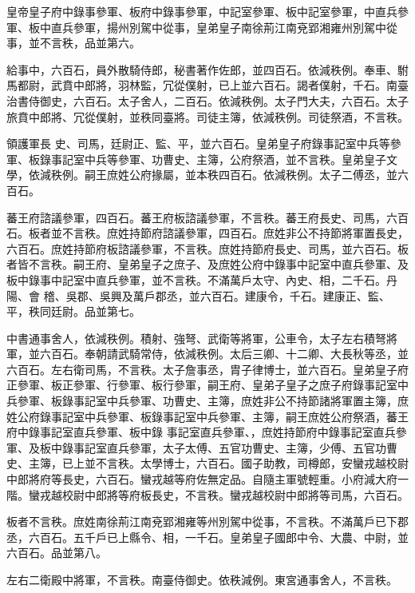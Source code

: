 \begin{pinyinscope}
 皇帝皇子府中錄事參軍、板府中錄事參軍，中記室參軍、板中記室參軍，中直兵參軍、板中直兵參軍，揚州別駕中從事，皇弟皇子南徐荊江南兗郢湘雍州別駕中從事，並不言秩，品並第六。



 給事中，六百石，員外散騎侍郎，秘書著作佐郎，並四百石。依減秩例。奉車、駙馬都尉，武賁中郎將，羽林監，冗從僕射，已上並六百石。謁者僕射，千石。南臺治書侍御史，六百石。太子舍人，二百石。依減秩例。太子門大夫，六百石。太子旅賁中郎將、冗從僕射，並秩同臺將。司徒主簿，依減秩例。司徒祭酒，不言秩。



 領護軍長
 史、司馬，廷尉正、監、平，並六百石。皇弟皇子府錄事記室中兵等參軍、板錄事記室中兵等參軍、功曹史、主簿，公府祭酒，並不言秩。皇弟皇子文學，依減秩例。嗣王庶姓公府掾屬，並本秩四百石。依減秩例。太子二傅丞，並六百石。



 蕃王府諮議參軍，四百石。蕃王府板諮議參軍，不言秩。蕃王府長史、司馬，六百石。板者並不言秩。庶姓持節府諮議參軍，四百石。庶姓非公不持節將軍置長史，六百石。庶姓持節府板諮議參軍，不言秩。庶姓持節府長史、司馬，並六百石。板者皆不言秩。嗣王府、皇弟皇子之庶子、及庶姓公府中錄事中記室中直兵參軍、及板中錄事中記室中直兵參軍，並不言秩。不滿萬戶太守、內史、相，二千石。丹陽、會
 稽、吳郡、吳興及萬戶郡丞，並六百石。建康令，千石。建康正、監、平，秩同廷尉。品並第七。



 中書通事舍人，依減秩例。積射、強弩、武衛等將軍，公車令，太子左右積弩將軍，並六百石。奉朝請武騎常侍，依減秩例。太后三卿、十二卿、大長秋等丞，並六百石。左右衛司馬，不言秩。太子詹事丞，胄子律博士，並六百石。皇弟皇子府正參軍、板正參軍、行參軍、板行參軍，嗣王府、皇弟子皇子之庶子府錄事記室中兵參軍、板錄事記室中兵參軍、功曹史、主簿，庶姓非公不持節諸將軍置主簿，庶姓公府錄事記室中兵參軍、板錄事記室中兵參軍、主簿，嗣王庶姓公府祭酒，蕃王府中錄事記室直兵參軍、板中錄
 事記室直兵參軍、，庶姓持節府中錄事記室直兵參軍、及板中錄事記室直兵參軍，太子太傅、五官功曹史、主簿，少傅、五官功曹史、主簿，已上並不言秩。太學博士，六百石。國子助教，司樽郎，安蠻戎越校尉中郎將府等長史，六百石。蠻戎越等府佐無定品。自隨主軍號輕重。小府減大府一階。蠻戎越校尉中郎將等府板長史，不言秩。蠻戎越校尉中郎將等司馬，六百石。



 板者不言秩。庶姓南徐荊江南兗郢湘雍等州別駕中從事，不言秩。不滿萬戶已下郡丞，六百石。五千戶已上縣令、相，一千石。皇弟皇子國郎中令、大農、中尉，並六百石。品並第八。



 左右二衛殿中將軍，不言秩。南臺侍御史。依秩減例。東宮通事舍人，不言秩。




\end{pinyinscope}
